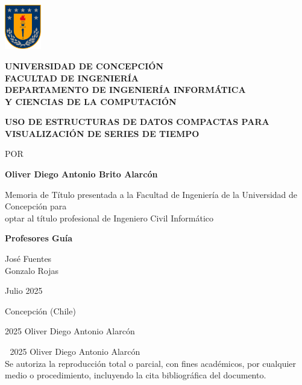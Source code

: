 \documentclass[12pt,twoside]{report}
\begin{document}
\pagestyle{empty}

\begin{titlepage}
    \includegraphics[height=55pt]{escudoUdec}
    \begin{minipage}[b][60pt][c]{70ex}
    	\bfseries
        UNIVERSIDAD DE CONCEPCIÓN\\
        FACULTAD DE INGENIERÍA\\
        DEPARTAMENTO DE INGENIERÍA INFORMÁTICA\\
        Y CIENCIAS DE LA COMPUTACIÓN
    \end{minipage}
    \vspace{3cm}
    
    \begin{center}	
        \uppercase{\large\textbf{Uso De Estructuras De Datos Compactas Para Visualización De Series De Tiempo}}

        \vspace{1.5cm}
        POR
        \bigskip

        \textbf{Oliver Diego Antonio Brito Alarcón}

        \vspace{2cm}
        {\small Memoria de Título presentada a la Facultad de Ingeniería de la Universidad de Concepción para\\
        optar al título profesional de Ingeniero Civil Informático}
	
        \vspace{2cm}	
        \textbf{Profesores Guía} \\
        \bigskip
        
        José Fuentes \\
        Gonzalo Rojas


        \vfill
        Julio 2025

        Concepción (Chile)
        
        \bigskip
        \textcopyright{}
        2025 Oliver Diego Antonio Alarcón
	\end{center}
\end{titlepage}

\textcolor{white}{.}
\vfill
\noindent\textcopyright{}
2025 Oliver Diego Antonio Alarcón\\
Se autoriza la reproducción total o parcial, con fines académicos, por cualquier medio o procedimiento, incluyendo la cita bibliográfica del documento.
\end{document}
